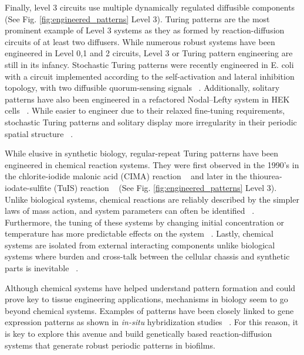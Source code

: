 Finally, level 3 circuits use multiple dynamically regulated diffusible components (See Fig. \ref{fig:engineered_patterns} Level 3).
Turing patterns are the most prominent example of Level 3 systems as they as formed by reaction-diffusion circuits of at least two diffusers.
While numerous robust systems have been engineered in Level 0,1 and 2 circuits, Level 3 or Turing pattern engineering are still in its infancy.
Stochastic Turing patterns were recently engineered in E. coli with a circuit implemented according to the self-activation and lateral inhibition topology, with two diffusible quorum-sensing signals ~\parencite{Karig2018}.
Additionally, solitary patterns have also been engineered in a refactored Nodal–Lefty system in HEK cells ~\parencite{Sekine2018}.
While easier to engineer due to their relaxed fine-tuning requirements, stochastic Turing patterns and solitary display more irregularity in their periodic spatial structure ~\parencite{Butler2011, Karig2018,Sekine2018}.

While elusive in synthetic biology, regular-repeat Turing patterns have been engineered in chemical reaction systems.
They were first observed in the 1990's in the chlorite-iodide malonic acid (CIMA) reaction  ~\parencite{Castets, Lengyel1992} and later in the thiourea-iodate-sulfite (TuIS) reaction ~\parencite{Horvath} (See Fig. \ref{fig:engineered_patterns} Level 3).
Unlike biological systems, chemical reactions are reliably described by the simpler laws of mass action, and system parameters can often be identified ~\parencite{turanyi1994, kugler2009, Pusnik2019, Yeoh2019}.
Furthermore, the tuning of these systems by changing initial concentration or temperature has more predictable effects on the system ~\parencite{Horvath, landeira2010, Asakura2011}.
Lastly, chemical systems are isolated from external interacting components unlike biological systems where burden and cross-talk between the cellular chassis and synthetic parts is inevitable ~\parencite{Ceroni2015, Nielsen2016,Butzin2018, Du2020}.


Although chemical systems have helped understand pattern formation and could prove key to tissue engineering applications, mechanisms in biology seem to go beyond chemical systems.
Examples of patterns have been closely linked to gene expression patterns as shown in \textit{in-situ} hybridization studies ~\parencite{Jing2006}.
For this reason, it is key to explore this avenue and build genetically based reaction-diffusion systems that generate robust periodic patterns in biofilms.


